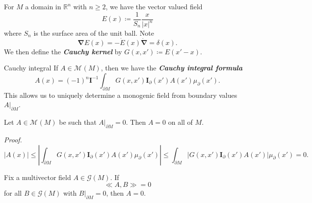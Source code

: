 \documentclass[aspectratio=169,handout]{beamer}
\newcommand\boldgreen[1]{\textcolor{lighter_csu_green}{\emph{\textbf{#1}}}}
\newcommand{\R}{\mathbb{R}}
\newcommand{\grad}{\boldsymbol{\nabla}}
\newcommand{\G}{\mathcal{G}}
\newcommand{\blade}[1]{\boldsymbol{#1}}
\newcommand{\multivecinnerproduct}[2]{\ll #1, #2\gg}
\newcommand{\boundary}{{\partial M}}
\newcommand{\pseudoscalar}{\blade{I}}
\newcommand{\monogenicfields}[1]{\mathcal{M}^{#1}(M)}
\begin{document}
\begin{frame}{}
\vfill
For $M$ a domain in $\R^n$ with $n\geq 2$, we have the vector valued field
\[
E(x) \coloneqq \frac{1}{S_n} \frac{x}{|x|^n}
\]
where $S_n$ is the surface area of the unit ball. Note
\[
\grad E(x) = -\dot{E}(x)\dot{\grad} = \delta(x).
\]
We then define the \boldgreen{Cauchy kernel} by $G(x,x')\coloneqq E(x'-x)$.
\vfill
\end{frame}

\begin{frame}{Cauchy integral}
\vfill
If $A\in \monogenicfields{}$, then we have the \boldgreen{Cauchy integral formula}
\[
A(x) = (-1)^n \pseudoscalar^{-1} \int_\boundary G(x,x') \pseudoscalar_\partial(x') A(x') \mu_\partial(x').
\]
This allows us to uniquely determine a monogenic field from boundary values $A\vert_\boundary$.
\vfill
\end{frame}

\begin{frame}{}
\vfill
\begin{lemma}
Let $A\in \monogenicfields{}$ be such that $A\vert_\boundary = 0$. Then $A=0$ on all of $M$.
\end{lemma}
\emph{Proof.}
\[
|A(x)| \leq \left| \int_{\boundary} G(x,x') \pseudoscalar_{\partial}(x') A(x') \mu_\partial(x') \right| \leq  \int_{\boundary}\left| G(x,x') \pseudoscalar_{\partial}(x') A(x') \right| \mu_\partial(x') =0.
\]
\vfill
\end{frame}


\begin{frame}{}
\vfill
\begin{lemma}
Fix a multivector field $A\in \G(M)$. If
\[
\multivecinnerproduct{A}{B}=0
\]
for all $B\in \G(M)$ with $B\vert_{\boundary} = 0$, then $A=0$.
\end{lemma}
\vfill
\end{frame}
\end{document}
